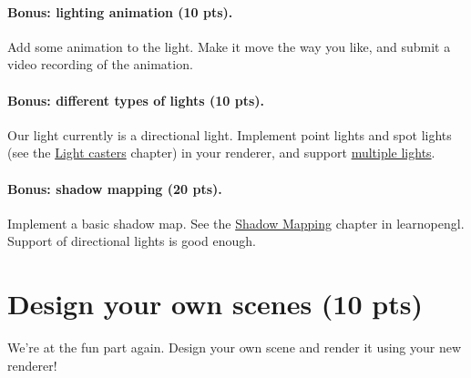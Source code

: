 \paragraph{Bonus: lighting animation (10 pts).} Add some animation to the light. Make it move the way you like, and submit a video recording of the animation.

\paragraph{Bonus: different types of lights (10 pts).} Our light currently is a directional light. Implement point lights and spot lights (see the \href{https://learnopengl.com/Lighting/Light-casters}{Light casters} chapter) in your renderer, and support \href{https://learnopengl.com/Lighting/Multiple-lights}{multiple lights}.

\paragraph{Bonus: shadow mapping (20 pts).} Implement a basic shadow map. See the \href{https://learnopengl.com/Advanced-Lighting/Shadows/Shadow-Mapping}{Shadow Mapping} chapter in learnopengl. Support of directional lights is good enough. 

\section{Design your own scenes (10 pts)}
We're at the fun part again. Design your own scene and render it using your new renderer!

%
%


